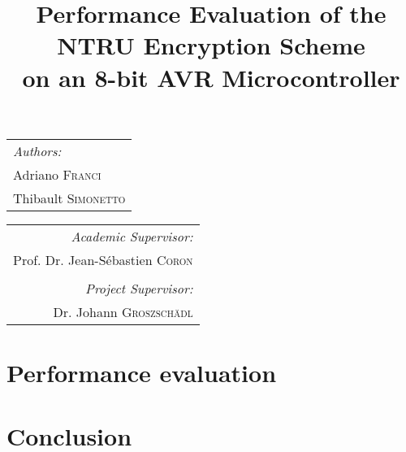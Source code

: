 \documentclass[11pt,a4paper]{article}
\begin{document}
\title{Performance Evaluation of the NTRU Encryption Scheme\\ on an 8-bit AVR 
Microcontroller}
\maketitle

\begin{tabular}[t]{@{}l} 
	\textit{Authors:}\\
	Adriano \textsc{Franci}\\
	Thibault \textsc{Simonetto}\\
\end{tabular}
\hfill
\begin{tabular}[t]{r@{}}
	\textit{Academic Supervisor:}\\
	Prof. Dr. Jean-S\'ebastien \textsc{Coron}\\
	\vspace{1em}\\
	\textit{Project Supervisor:}\\
	Dr. Johann \textsc{Groszsch\"adl}\\
\end{tabular}









\section{Performance evaluation}
\section{Conclusion}




\end{document}
